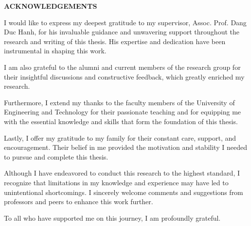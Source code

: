 \setlength{\parindent}{1cm}
\setcounter{page}{1}

\begin{center}
  \textbf{\large{ACKNOWLEDGEMENTS}	}
\end{center}

I would like to express my deepest gratitude to my supervisor, Assoc. Prof. Dang Duc Hanh, 
for his invaluable guidance and unwavering support throughout the research and 
writing of this thesis. His expertise and dedication have been instrumental in shaping this work.

I am also grateful to the alumni and current members of 
the research group for their insightful discussions and 
constructive feedback, which greatly enriched my research.

Furthermore, I extend my thanks to the faculty members of the University 
of Engineering and Technology for their passionate teaching and for 
equipping me with the essential knowledge and skills that form 
the foundation of this thesis.

Lastly, I offer my gratitude to my family for their constant 
care, support, and encouragement. Their belief in me provided 
the motivation and stability I needed to pursue and complete this 
thesis.

Although I have endeavored to conduct this research to 
the highest standard, I recognize that limitations in my knowledge 
and experience may have led to unintentional shortcomings. 
I sincerely welcome comments and suggestions from professors and peers 
to enhance this work further.

To all who have supported me on this journey, I am profoundly grateful.




